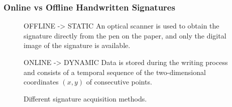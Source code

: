 \documentclass{beamer}
\begin{document}
\begin{frame}
\frametitle{Online vs Offline Handwritten Signatures}

\begin{figure}[!htpb]
\begin{block}{OFFLINE -> STATIC}
An optical scanner is used to obtain the signature directly from the pen on the paper, and only the digital image of the signature is available.
\end{block}

\begin{block}{ONLINE -> DYNAMIC}
Data is stored during the writing process and consists of a temporal sequence of the two-dimensional coordinates $(x, y)$ of consecutive points. 
\end{block}
\centering
\hspace*{0.5in} %
\caption{Different signature acquisition methods. } \label{fig:acquisition}
\end{figure}
\end{frame}
\end{document}

